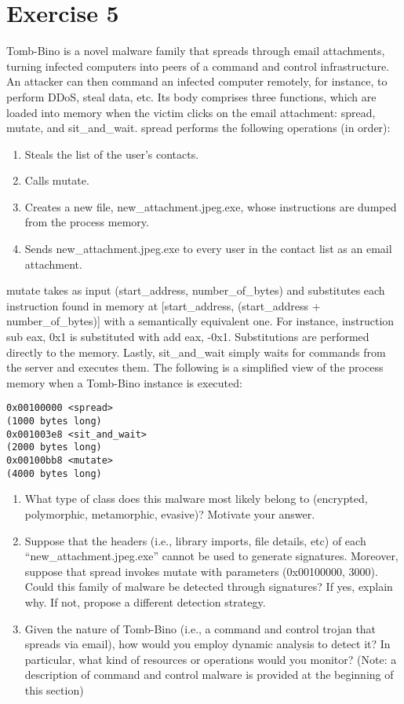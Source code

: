 \section{Exercise 5}

Tomb-Bino is a novel malware family that spreads through email attachments, turning infected computers into peers of a command and control infrastructure. 
An attacker can then command an infected computer remotely, for instance, to perform DDoS, steal data, etc.
Its body comprises three functions, which are loaded into memory when the victim clicks on the email attachment: spread, mutate, and sit\_and\_wait.
spread performs the following operations (in order):
\begin{enumerate}
    \item Steals the list of the user's contacts.
    \item Calls mutate.
    \item Creates a new file, new\_attachment.jpeg.exe, whose instructions are dumped from the process memory.
    \item Sends new\_attachment.jpeg.exe to every user in the contact list as an email attachment.
\end{enumerate}
mutate takes as input (start\_address, number\_of\_bytes) and substitutes each instruction found in memory at [start\_address, (start\_address + number\_of\_bytes)] with a semantically equivalent one. 
For instance, instruction sub eax, 0x1 is substituted with add eax, -0x1. 
Substitutions are performed directly to the memory.
Lastly, sit\_and\_wait simply waits for commands from the server and executes them.
The following is a simplified view of the process memory when a Tomb-Bino instance is executed:
\begin{verbatim}
0x00100000 <spread>
(1000 bytes long)
0x001003e8 <sit_and_wait>
(2000 bytes long)
0x00100bb8 <mutate>
(4000 bytes long)
\end{verbatim}
\begin{enumerate}
    \item What type of class does this malware most likely belong to (encrypted, polymorphic, metamorphic, evasive)?
        Motivate your answer. 
    \item Suppose that the headers (i.e., library imports, file details, etc) of each “new\_attachment.jpeg.exe” cannot be used to generate signatures. 
        Moreover, suppose that spread invokes mutate with parameters (0x00100000, 3000).
        Could this family of malware be detected through signatures? 
        If yes, explain why. 
        If not, propose a different detection strategy. 
    \item Given the nature of Tomb-Bino (i.e., a command and control trojan that spreads via email), how would you employ dynamic analysis to detect it? 
        In particular, what kind of resources or operations would you monitor? 
        (Note: a description of command and control malware is provided at the beginning of this section)
\end{enumerate}

